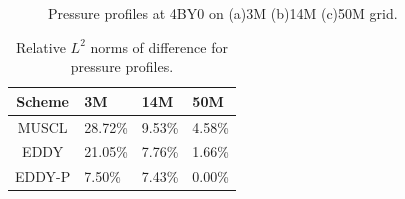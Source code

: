 \begin{figure}[t]
     \caption{Pressure profiles at 4BY0 on (a)3M (b)14M (c)50M grid.}
     \label{p}            
\end{figure}
\begin{table}[t]
\caption{Relative $L^{2}$ norms of difference for pressure profiles.}
\begin{center}
\label{table2}
\begin{tabular}{c l l l}
\hline
Scheme & 3M     & 14M    & 50M    \\ 
\hline
MUSCL  & 28.72\% & 9.53\% & 4.58\% \\ 
EDDY   & 21.05\% & 7.76\% & 1.66\% \\ 
EDDY-P & 7.50\% & 7.43\% & 0.00\% \\
\hline 
\end{tabular}
\end{center}
\end{table}
